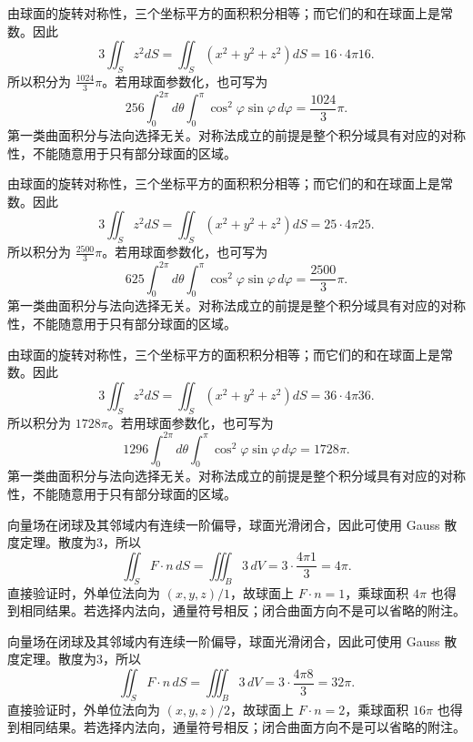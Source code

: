 \documentclass[UTF8,12pt,a4paper,fontset=fandol]{ctexart}
\begin{document}
\begin{solve}\label{ans:c43q10}
由球面的旋转对称性，三个坐标平方的面积积分相等；而它们的和在球面上是常数。因此
\[
3\iint_Sz^2dS=\iint_S(x^2+y^2+z^2)dS=16\cdot4\pi16.
\]
所以积分为 $\frac{1024}{3}\pi$。若用球面参数化，也可写为
\[
256\int_0^{2\pi}d\theta\int_0^\pi\cos^2\varphi\sin\varphi\,d\varphi=\frac{1024}{3}\pi.
\]
第一类曲面积分与法向选择无关。对称法成立的前提是整个积分域具有对应的对称性，不能随意用于只有部分球面的区域。
\end{solve}

\begin{solve}\label{ans:c43q11}
由球面的旋转对称性，三个坐标平方的面积积分相等；而它们的和在球面上是常数。因此
\[
3\iint_Sz^2dS=\iint_S(x^2+y^2+z^2)dS=25\cdot4\pi25.
\]
所以积分为 $\frac{2500}{3}\pi$。若用球面参数化，也可写为
\[
625\int_0^{2\pi}d\theta\int_0^\pi\cos^2\varphi\sin\varphi\,d\varphi=\frac{2500}{3}\pi.
\]
第一类曲面积分与法向选择无关。对称法成立的前提是整个积分域具有对应的对称性，不能随意用于只有部分球面的区域。
\end{solve}

\begin{solve}\label{ans:c43q12}
由球面的旋转对称性，三个坐标平方的面积积分相等；而它们的和在球面上是常数。因此
\[
3\iint_Sz^2dS=\iint_S(x^2+y^2+z^2)dS=36\cdot4\pi36.
\]
所以积分为 $1728\pi$。若用球面参数化，也可写为
\[
1296\int_0^{2\pi}d\theta\int_0^\pi\cos^2\varphi\sin\varphi\,d\varphi=1728\pi.
\]
第一类曲面积分与法向选择无关。对称法成立的前提是整个积分域具有对应的对称性，不能随意用于只有部分球面的区域。
\end{solve}

\begin{solve}\label{ans:c43q13}
向量场在闭球及其邻域内有连续一阶偏导，球面光滑闭合，因此可使用 Gauss 散度定理。散度为3，所以
\[
\iint_SF\cdot n\,dS=\iiint_B3\,dV=3\cdot\frac{4\pi1}3=4\pi.
\]
直接验证时，外单位法向为 $(x,y,z)/1$，故球面上 $F\cdot n=1$，乘球面积 $4\pi$ 也得到相同结果。若选择内法向，通量符号相反；闭合曲面方向不是可以省略的附注。
\end{solve}

\begin{solve}\label{ans:c43q14}
向量场在闭球及其邻域内有连续一阶偏导，球面光滑闭合，因此可使用 Gauss 散度定理。散度为3，所以
\[
\iint_SF\cdot n\,dS=\iiint_B3\,dV=3\cdot\frac{4\pi8}3=32\pi.
\]
直接验证时，外单位法向为 $(x,y,z)/2$，故球面上 $F\cdot n=2$，乘球面积 $16\pi$ 也得到相同结果。若选择内法向，通量符号相反；闭合曲面方向不是可以省略的附注。
\end{solve}
\end{document}
